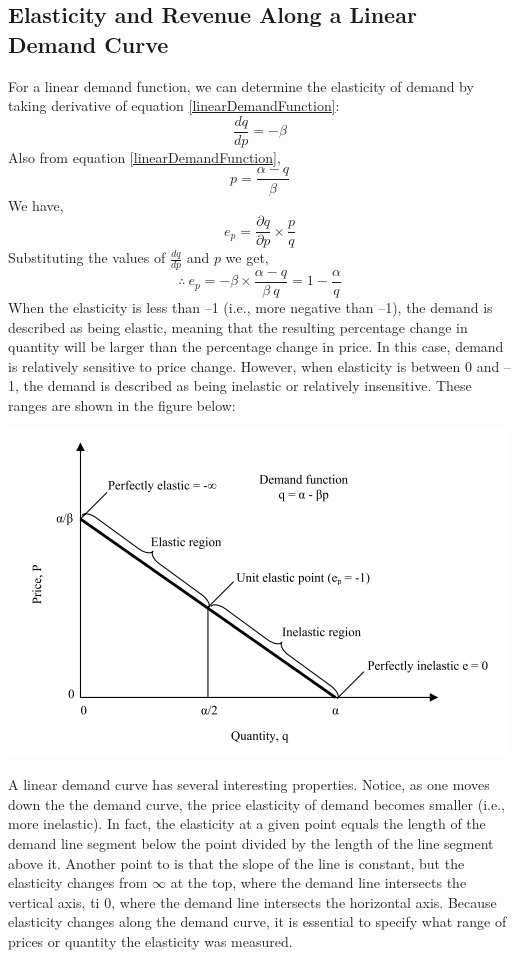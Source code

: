 \subsection{Elasticity and Revenue Along a Linear Demand Curve}
For a linear demand function, we can determine the elasticity of demand by taking derivative of equation \ref{linearDemandFunction}:
$$ \frac{dq}{dp} = - \beta$$
Also from equation \ref{linearDemandFunction},
$$ p =  \frac{\alpha - q}{\beta} $$
We have,
$$ e_p = \frac{\partial q}{\partial p} \times \frac{p}{q} $$
Substituting the values of $\frac{dq}{dp}$ and $p$ we get,
\begin{equation}
	\therefore \:e_p = -\beta \times \frac{\alpha - q}{\beta \: q} = 1 - \frac{\alpha}{q}
\end{equation}
When the elasticity is less than –1 (i.e., more negative than –1), the demand is described as being elastic, meaning that the resulting percentage change in quantity will be larger than the percentage change in price. In this case, demand is relatively sensitive to price change. However, when elasticity is between 0 and –1, the demand is described as being inelastic or relatively insensitive. These ranges are shown in the figure below:
\begin{center}
	\includegraphics[scale=0.8]{gfx/fig46.png}
\end{center}
A linear demand curve has several interesting properties. Notice, as one moves down the the demand curve, the price elasticity of demand becomes smaller (i.e., more inelastic). In fact, the elasticity at a given point equals the length of the demand line segment below the point divided by the length of the line segment above it. Another point to is that the slope of the line is constant, but the elasticity changes from $\infty$ at the top, where the demand line intersects the vertical axis, ti $0$, where the demand line intersects the horizontal axis. Because elasticity changes along the demand curve, it is essential to specify what range of prices or quantity the elasticity was measured.\\\\
